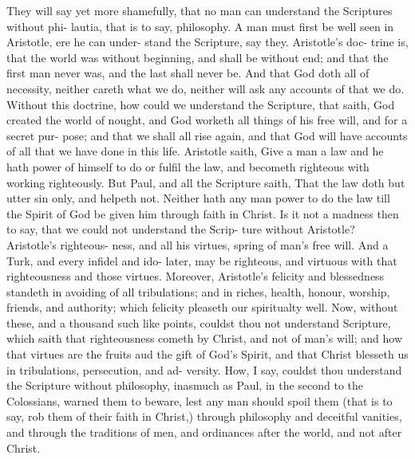\documentclass{custom}
\begin{document}
They will say yet more shamefully, that no 
man can understand the Scriptures without phi- 
lautia, that is to say, philosophy. A man must 
first be well seen in Aristotle, ere he can under- 
stand the Scripture, say they. Aristotle's doc- 
trine is, that the world was without beginning, 
and shall be without end; and that the first man 
never was, and the last shall never be. And 
that God doth all of necessity, neither careth 
what we do, neither will ask any accounts of 
that we do. Without this doctrine, how could 
we understand the Scripture, that saith, God 
created the world of nought, and God worketh 
all things of his free will, and for a secret pur- 
pose; and that we shall all rise again, and that 
God will have accounts of all that we have done 
in this life. Aristotle saith, Give a man a law
and he hath power of himself to do or fulfil the 
law, and becometh righteous with working 
righteously. But Paul, and all the Scripture
saith, That the law doth but utter sin only, 
and helpeth not. Neither hath any man power 
to do the law till the Spirit of God be given him 
through faith in Christ. Is it not a madness then 
to say, that we could not understand the Scrip- 
ture without Aristotle? Aristotle's righteous-
ness, and all his virtues, spring of man's free 
will. And a Turk, and every infidel and ido- 
later, may be righteous, and virtuous with that 
righteousness and those virtues. Moreover, 
Aristotle's felicity and blessedness standeth in 
avoiding of all tribulations; and in riches, health, 
honour, worship, friends, and authority; which 
felicity pleaseth our spiritualty well. Now, 
without these, and a thousand such like points, 
couldst thou not understand Scripture, which
saith that righteousness cometh by Christ, and 
not of man's will; and how that virtues are the 
fruits aud the gift of God's Spirit, and that Christ 
blesseth us in tribulations, persecution, and ad- 
versity. How, I say, couldst thou understand 
the Scripture without philosophy, inasmuch as 
Paul, in the second to the Colossians, warned 
them to beware, lest any man should spoil them 
(that is to say, rob them of their faith in Christ,) 
through philosophy and deceitful vanities, and 
through the traditions of men, and ordinances 
after the world, and not after Christ. 
\end{document}
